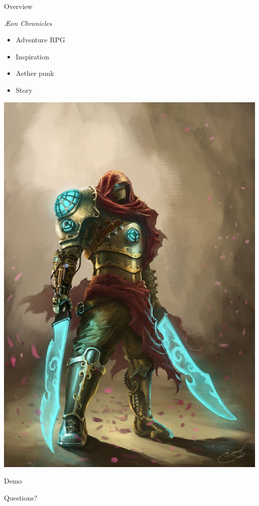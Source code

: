 \documentclass{../teamepsilon}
\title{\aeon}
\author{\te}
\institute{Colorado School of Mines}
\newcommand\aeon{\textit{\AE on Chronicles}\xspace}
\begin{document}
\begin{frame}{Overview}
    \begin{minipage}{0.55\textwidth}
        \aeon
        \begin{itemize}
            \item Adventure RPG
            \item Inspiration
            \item Aether punk
            \item Story
        \end{itemize}
    \end{minipage}%
    \begin{minipage}{0.45\textwidth}
        \includegraphics[scale=0.15]{../graphics/warrior}
    \end{minipage}
\end{frame}


\begin{frame}[standout]
    \Huge
    Demo
\end{frame}


\begin{frame}[standout]
    \Huge
    Questions?
\end{frame}
\end{document}
